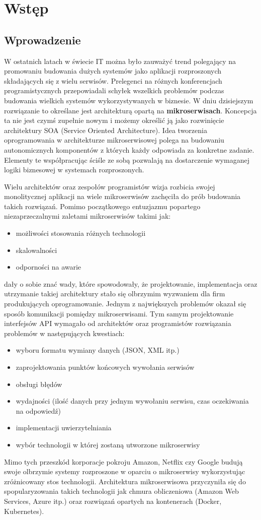 \chapter{Wstęp}
\section{Wprowadzenie}
W ostatnich latach w świecie IT można było zauważyć trend polegający na promowaniu budowania dużych systemów jako aplikacji rozproszonych składających się z wielu serwisów. Prelegenci na różnych konferencjach programistycznych przepowiadali schyłek wszelkich problemów podczas budowania wielkich systemów wykorzystywanych w biznesie. W dniu dzisiejszym rozwiązanie to określane jest architekturą opartą na \textbf{mikroserwisach}. Koncepcja ta nie jest czymś zupełnie nowym i możemy określić ją jako rozwinięcie architektury SOA (Service Oriented Architecture). Idea tworzenia oprogramowania w architekturze mikroserwisowej polega na budowaniu autonomicznych komponentów z których każdy odpowiada za konkretne zadanie. Elementy te współpracując ściśle ze sobą pozwalają na dostarczenie wymaganej logiki biznesowej w systemach rozproszonych. \par Wielu architektów oraz zespołów programistów wizja rozbicia swojej monolitycznej aplikacji na wiele mikroserwisów zachęciła do prób budowania takich rozwiązań. Pomimo początkowego entuzjazmu popartego niezaprzeczalnymi zaletami mikroserwisów takimi jak:
\begin{itemize}
	\item możliwości stosowania różnych technologii
	\item skalowalności
	\item odporności na awarie
\end{itemize}
dały o sobie znać wady, które spowodowały, że projektowanie, implementacja oraz utrzymanie takiej architektury stało się olbrzymim wyzwaniem dla firm produkujących oprogramowanie. Jednym z największych problemów okazał się sposób komunikacji pomiędzy mikroserwisami. Tym samym projektowanie interfejsów API\cite{jacobson2015interfejsapi} wymagało od architektów oraz programistów rozwiązania problemów w następujących kwestiach:
\begin{itemize}
	\item wyboru formatu wymiany danych (JSON, XML itp.)
	\item zaprojektowania punktów końcowych wywołania serwisów
	\item obsługi błędów
	\item wydajności (ilość danych przy jednym wywołaniu serwisu, czas oczekiwania na odpowiedź)
	\item implementacji uwierzytelniania
	\item wybór technologii w której zostaną utworzone mikroserwisy
\end{itemize}
Mimo tych przeszkód korporacje pokroju Amazon, Netflix czy Google budują swoje olbrzymie systemy rozproszone w oparciu o mikroserwisy wykorzystując zróżnicowany stos technologii. Architektura mikroserwisowa przyczyniła się do spopularyzowania takich technologii jak chmura obliczeniowa (Amazon Web Services, Azure itp.) oraz rozwiązań opartych na kontenerach (Docker, Kubernetes).
 

